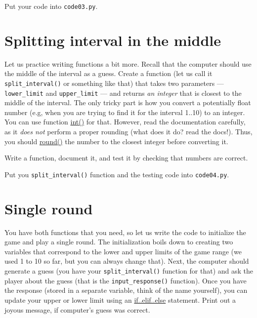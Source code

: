 \documentclass[
]{book}
\begin{document}
Put your code into \texttt{code03.py}.

\hypertarget{splitting-interval-in-the-middle}{%
\section{Splitting interval in the middle}\label{splitting-interval-in-the-middle}}

Let us practice writing functions a bit more. Recall that the computer should use the middle of the interval as a guess. Create a function (let us call it \texttt{split\_interval()} or something like that) that takes two parameters --- \texttt{lower\_limit} and \texttt{upper\_limit} --- and returns \emph{an integer} that is closest to the middle of the interval. The only tricky part is how you convert a potentially float number (e.g, when you are trying to find it for the interval 1..10) to an integer. You can use function \href{https://docs.python.org/3/library/functions.html\#int}{int()} for that. However, read the documentation carefully, as it \emph{does not} perform a proper rounding (what does it do? read the docs!). Thus, you should \href{https://docs.python.org/3/library/functions.html\#round}{round()} the number to the closest integer before converting it.

Write a function, document it, and test it by checking that numbers are correct.

Put you \texttt{split\_interval()} function and the testing code into \texttt{code04.py}.

\hypertarget{single-round}{%
\section{Single round}\label{single-round}}

You have both functions that you need, so let us write the code to initialize the game and play a single round. The initialization boils down to creating two variables that correspond to the lower and upper limits of the game range (we used 1 to 10 so far, but you can always change that). Next, the computer should generate a guess (you have your \texttt{split\_interval()} function for that) and ask the player about the guess (that is the \texttt{input\_response()} function). Once you have the response (stored in a separate variable, think of the name yourself), you can update your upper or lower limit using an \protect\hyperlink{if-statement}{if..elif..else} statement. Print out a joyous message, if computer's guess was correct.
\end{document}
